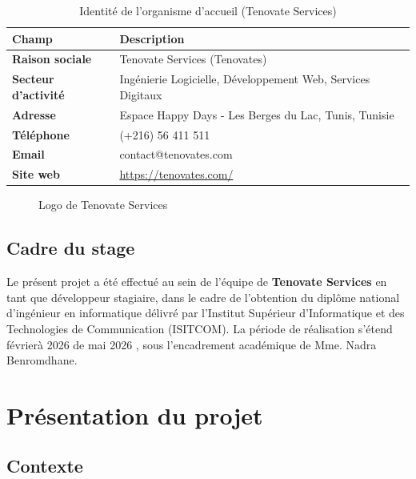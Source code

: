 \begin{table}[htbp]
\centering
\renewcommand{\arraystretch}{1.3}
\begin{tabular}{|l|p{9cm}|}
\hline
\textbf{Champ} & \textbf{Description} \\
\hline
\textbf{Raison sociale} & Tenovate Services (Tenovates) \\
\hline
\textbf{Secteur d'activité} & Ingénierie Logicielle, Développement Web, Services Digitaux \\
\hline
\textbf{Adresse} & Espace Happy Days - Les Berges du Lac, Tunis, Tunisie \\
\hline
\textbf{Téléphone} & (+216) 56 411 511 \\
\hline
\textbf{Email} & contact@tenovates.com \\
\hline
\textbf{Site web} & \url{https://tenovates.com/} \\
\hline
\end{tabular}
\caption{Identité de l'organisme d'accueil (Tenovate Services)}
\label{tab:organisme}
\end{table}

\begin{figure}[htbp]
    \centering
    \caption{Logo de Tenovate Services}
    \label{fig:logo_tenovates}
\end{figure}

\subsection{Cadre du stage}

Le présent projet a été effectué au sein de l'équipe de \textbf{Tenovate Services} en tant que développeur stagiaire, 
dans le cadre de l'obtention du diplôme national d'ingénieur en informatique délivré par 
l'Institut Supérieur d'Informatique et des Technologies de Communication (ISITCOM). La période de réalisation 
s'étend févrierà  2026 de mai 2026 , sous l'encadrement académique de Mme. Nadra Benromdhane.


\section{Présentation du projet}

\subsection{Contexte}

